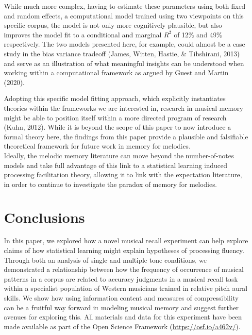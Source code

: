 \documentclass[english,man,floatsintext]{apa6}
\begin{document}
While much more complex, having to estimate these parameters using both fixed and random effects, a computational model trained using two viewpoints on this specific corpus, the model is not only more cognitively plausible, but also improves the model fit to a conditional and marginal \(R^2\) of 12\% and 49\% respectively.
The two models presented here, for example, could almost be a case study in the bias variance tradeoff (James, Witten, Hastie, \& Tibshirani, 2013) and serve as an illustration of what meaningful insights can be understood when working within a computational framework as argued by Guest and Martin (2020).

Adopting this specific model fitting approach, which explicitly instantiates theories within the frameworks we are interested in, research in musical memory might be able to position itself within a more directed program of research (Kuhn, 2012).
While it is beyond the scope of this paper to now introduce a formal theory here, the findings from this paper provide a plausible and falsifiable theoretical framework for future work in memory for melodies.\\
Ideally, the melodic memory literature can move beyond the number-of-notes models and take full advantage of this link to a statistical learning induced processing facilitation theory, allowing it to link with the expectation literature, in order to continue to investigate the paradox of memory for melodies.

\hypertarget{conclusions}{%
\section{Conclusions}\label{conclusions}}

In this paper, we explored how a novel musical recall experiment can help explore claims of how statistical learning might explain hypotheses of processing fluency.
Through both an analysis of single and multiple tone conditions, we demonstrated a relationship between how the frequency of occurrence of musical patterns in a corpus are related to accuracy judgments in a musical recall task within a specialist population of Western musicians trained in relative pitch aural skills.
We show how using information content and measures of compressibility can be a fruitful way forward in modeling musical memory and suggest further avenues for exploring this.
All materials and data for this experiment have been made available as part of the Open Science Framework (\url{https://osf.io/a462v/}).
\end{document}
